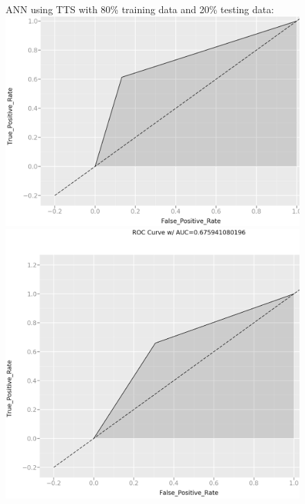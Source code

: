 \documentclass[11pt]{article}
\begin{document}
\begin{figure}[h]
\centering
ANN using TTS with 80\% training data and 20\% testing data:
\includegraphics[scale = .30]{ann1}
\includegraphics[scale = .25]{ann2}
\end{figure}


\newpage
\end{document}
